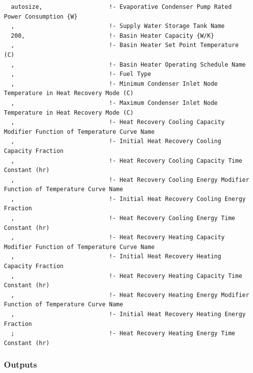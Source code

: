 \begin{lstlisting}
  autosize,                   !- Evaporative Condenser Pump Rated Power Consumption {W}
  ,                           !- Supply Water Storage Tank Name
  200,                        !- Basin Heater Capacity {W/K}
  ,                           !- Basin Heater Set Point Temperature (C)
  ,                           !- Basin Heater Operating Schedule Name
  ,                           !- Fuel Type
  ,                           !- Minimum Condenser Inlet Node Temperature in Heat Recovery Mode (C)
  ,                           !- Maximum Condenser Inlet Node Temperature in Heat Recovery Mode (C)
  ,                           !- Heat Recovery Cooling Capacity Modifier Function of Temperature Curve Name
  ,                           !- Initial Heat Recovery Cooling Capacity Fraction
  ,                           !- Heat Recovery Cooling Capacity Time Constant (hr)
  ,                           !- Heat Recovery Cooling Energy Modifier Function of Temperature Curve Name
  ,                           !- Initial Heat Recovery Cooling Energy Fraction
  ,                           !- Heat Recovery Cooling Energy Time Constant (hr)
  ,                           !- Heat Recovery Heating Capacity Modifier Function of Temperature Curve Name
  ,                           !- Initial Heat Recovery Heating Capacity Fraction
  ,                           !- Heat Recovery Heating Capacity Time Constant (hr)
  ,                           !- Heat Recovery Heating Energy Modifier Function of Temperature Curve Name
  ,                           !- Initial Heat Recovery Heating Energy Fraction
  ;                           !- Heat Recovery Heating Energy Time Constant (hr)
\end{lstlisting}

\subsubsection{Outputs}\label{outputs-039}

